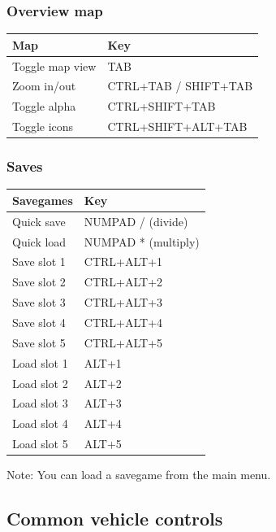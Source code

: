 \hypertarget{overview-map}{%
\subsubsection{Overview map}\label{overview-map}}

\begin{tabular}{ |l|l| } 
\hline
Map & Key \\
\hline
Toggle map view & TAB \\
\hline
Zoom in/out & CTRL+TAB / SHIFT+TAB \\
\hline
Toggle alpha & CTRL+SHIFT+TAB \\
\hline
Toggle icons & CTRL+SHIFT+ALT+TAB \\
\hline
\end{tabular}

\hypertarget{saves}{%
\subsubsection{Saves}\label{saves}}

\begin{tabular}{ |l|l| } 
\hline
Savegames & Key \\
\hline
Quick save & NUMPAD / (divide) \\
\hline
Quick load & NUMPAD * (multiply) \\
\hline
Save slot 1 & CTRL+ALT+1 \\
\hline
Save slot 2 & CTRL+ALT+2 \\
\hline
Save slot 3 & CTRL+ALT+3 \\
\hline
Save slot 4 & CTRL+ALT+4 \\
\hline
Save slot 5 & CTRL+ALT+5 \\
\hline
Load slot 1 & ALT+1 \\
\hline
Load slot 2 & ALT+2 \\
\hline
Load slot 3 & ALT+3 \\
\hline
Load slot 4 & ALT+4 \\
\hline
Load slot 5 & ALT+5 \\
\hline
\end{tabular}

Note: You can load a savegame from the main menu.

\hypertarget{common-vehicle-controls}{%
\subsection{Common vehicle controls}\label{common-vehicle-controls}}

